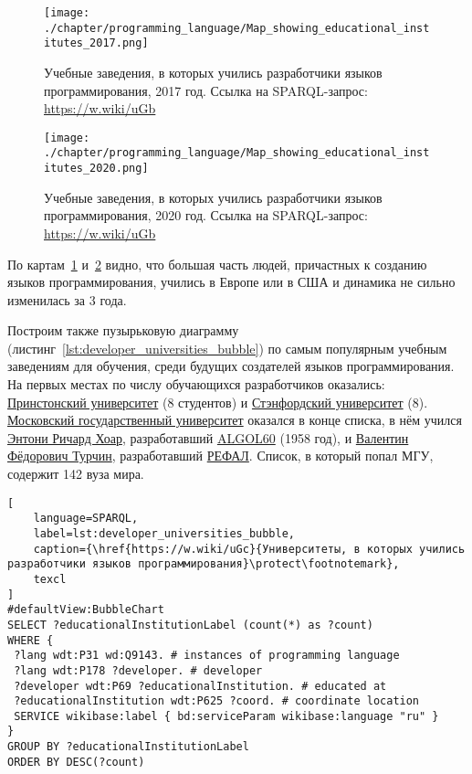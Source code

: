 \begin{figure}[h]
\centering
	\texttt{[image: ./chapter/programming\_language/Map\_showing\_educational\_institutes\_2017.png]}
	\caption{Учебные заведения, в которых учились разработчики языков программирования, 2017 год. Ссылка на SPARQL-запрос: \href{https://w.wiki/uGb}{https://w.wiki/uGb}}
	\label{fig:universities_2017}
\end{figure}
\begin{figure}[h]
\centering
	\texttt{[image: ./chapter/programming\_language/Map\_showing\_educational\_institutes\_2020.png]}
	\caption{Учебные заведения, в которых учились разработчики языков программирования, 2020 год. Ссылка на SPARQL-запрос: \href{https://w.wiki/uGb}{https://w.wiki/uGb}}
	\label{fig:universities_2020}
\end{figure}

По картам~\ref{fig:universities_2017} и~\ref{fig:universities_2020} видно, что большая часть людей, причастных к созданию языков программирования, учились в Европе или в США и динамика не сильно изменилась за 3 года.

Построим также пузырьковую диаграмму (листинг~\ref{lst:developer_universities_bubble}) по самым популярным учебным заведениям для обучения, среди будущих создателей языков программирования. На первых местах по числу обучающихся разработчиков оказались: \href{https://www.wikidata.org/wiki/Q21578}{Принстонский университет} (8 студентов) и \href{https://www.wikidata.org/wiki/Q41506}{Стэнфордский университет} (8). \href{https://ru.wikipedia.org/wiki/Московский_государственный_университет}{Московский государственный университет} оказался в конце списка, в нём учился \href{https://www.wikidata.org/wiki/Q92602}{Энтони Ричард Хоар}, разработавший \href{https://www.wikidata.org/wiki/Q188436}{ALGOL60} (1958 год), и \href{https://www.wikidata.org/wiki/Q4466506}{Валентин Фёдорович Турчин}, разработавший \href{https://www.wikidata.org/wiki/Q2626418}{РЕФАЛ}. Список, в который попал МГУ, содержит 142 вуза мира.

\begin{lstlisting}[
	language=SPARQL,
	label=lst:developer_universities_bubble,
	caption={\href{https://w.wiki/uGc}{Университеты, в которых учились разработчики языков программирования}\protect\footnotemark},
	texcl
]
#defaultView:BubbleChart
SELECT ?educationalInstitutionLabel (count(*) as ?count)
WHERE {
 ?lang wdt:P31 wd:Q9143. # instances of programming language
 ?lang wdt:P178 ?developer. # developer
 ?developer wdt:P69 ?educationalInstitution. # educated at
 ?educationalInstitution wdt:P625 ?coord. # coordinate location
 SERVICE wikibase:label { bd:serviceParam wikibase:language "ru" } 	
}
GROUP BY ?educationalInstitutionLabel
ORDER BY DESC(?count)
\end{lstlisting}

